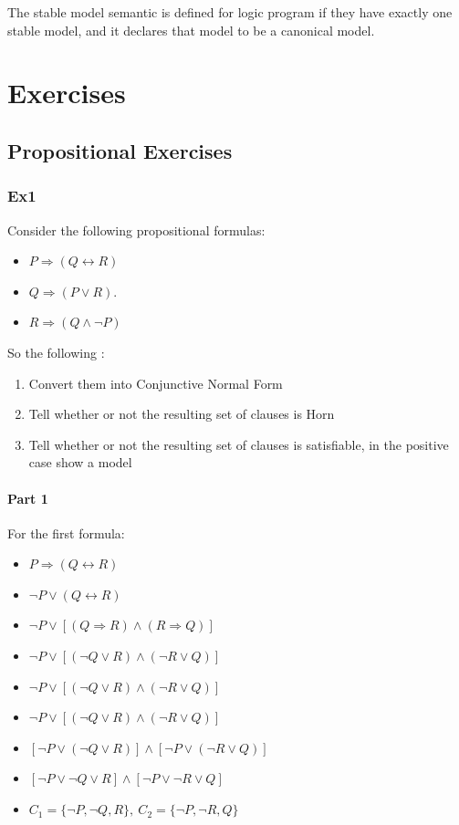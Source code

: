 \documentclass[10pt,a4paper]{article}
\newcommand{\changelocaltocdepth}[1]{%
  \addtocontents{toc}{\protect\setcounter{tocdepth}{#1}}%
  \setcounter{tocdepth}{#1}%
}
\begin{document}
\begin{itemize}
The stable model semantic is defined for logic program if they have exactly one stable model, and it declares that model to be a canonical model.




\newpage
\changelocaltocdepth{2}

\section{Exercises}

\subsection{Propositional Exercises}

\subsubsection{Ex1}
Consider the following propositional formulas:
\begin{itemize}
\item $P \Rightarrow (Q \leftrightarrow R)$
\item $Q \Rightarrow (P \vee R)$.
\item $R \Rightarrow (Q \wedge \neg P)$
\end{itemize}

So the following :
\begin{enumerate}
\item Convert them into Conjunctive Normal Form
\item Tell whether or not the resulting set of clauses is Horn
\item Tell whether or not the resulting set of clauses is satisfiable,
in the positive case show a model
\end{enumerate}

\paragraph{Part 1}

For the first formula:
\begin{itemize}
\item $P \Rightarrow (Q \leftrightarrow R)$
\item $\neg P \vee (Q \leftrightarrow R)$
\item $\neg P \vee [(Q \Rightarrow R) \wedge (R \Rightarrow Q)]$
\item $\neg P \vee [(\neg Q \vee R) \wedge (\neg R \vee Q)]$
\item $\neg P \vee [(\neg Q \vee R) \wedge (\neg R \vee Q)]$
\item $\neg P \vee [(\neg Q \vee R) \wedge (\neg R \vee Q)]$
\item $[\neg P \vee (\neg Q \vee R)] \wedge [\neg P \vee  (\neg R \vee Q)]$
\item $[\neg P \vee \neg Q \vee R] \wedge [\neg P \vee  \neg R \vee Q]$
\item $C_1=\lbrace \neg P, \neg Q , R\rbrace,\ C_2=\lbrace \neg P,  \neg R, Q\rbrace$
\end{itemize}


\end{itemize}
\end{document}
